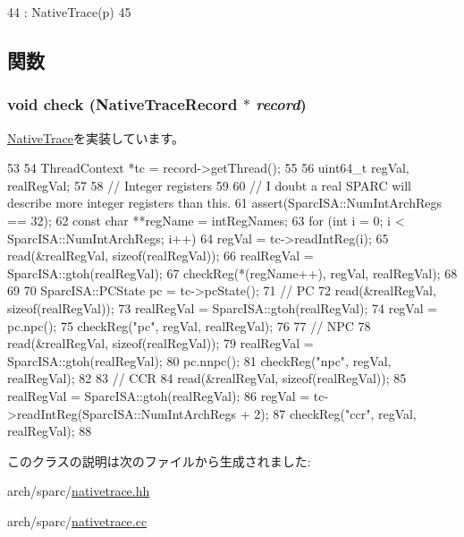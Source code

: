 \begin{DoxyCode}
44                                       : NativeTrace(p)
45     {}
\end{DoxyCode}


\subsection{関数}
\hypertarget{classTrace_1_1SparcNativeTrace_a826e1279dfa7dd9ce6760a2e6efe4116}{
\subsubsection[{check}]{\setlength{\rightskip}{0pt plus 5cm}void check ({\bf NativeTraceRecord} $\ast$ {\em record})}}
\label{classTrace_1_1SparcNativeTrace_a826e1279dfa7dd9ce6760a2e6efe4116}


\hyperlink{classTrace_1_1NativeTrace_adb484644aa43b4370d31b6a7286b0dd1}{NativeTrace}を実装しています。


\begin{DoxyCode}
53 {
54     ThreadContext *tc = record->getThread();
55 
56     uint64_t regVal, realRegVal;
57 
58     // Integer registers
59 
60     // I doubt a real SPARC will describe more integer registers than this.
61     assert(SparcISA::NumIntArchRegs == 32);
62     const char **regName = intRegNames;
63     for (int i = 0; i < SparcISA::NumIntArchRegs; i++) {
64         regVal = tc->readIntReg(i);
65         read(&realRegVal, sizeof(realRegVal));
66         realRegVal = SparcISA::gtoh(realRegVal);
67         checkReg(*(regName++), regVal, realRegVal);
68     }
69 
70     SparcISA::PCState pc = tc->pcState();
71     // PC
72     read(&realRegVal, sizeof(realRegVal));
73     realRegVal = SparcISA::gtoh(realRegVal);
74     regVal = pc.npc();
75     checkReg("pc", regVal, realRegVal);
76 
77     // NPC
78     read(&realRegVal, sizeof(realRegVal));
79     realRegVal = SparcISA::gtoh(realRegVal);
80     pc.nnpc();
81     checkReg("npc", regVal, realRegVal);
82 
83     // CCR
84     read(&realRegVal, sizeof(realRegVal));
85     realRegVal = SparcISA::gtoh(realRegVal);
86     regVal = tc->readIntReg(SparcISA::NumIntArchRegs + 2);
87     checkReg("ccr", regVal, realRegVal);
88 }
\end{DoxyCode}


このクラスの説明は次のファイルから生成されました:\begin{DoxyCompactItemize}
\item 
arch/sparc/\hyperlink{arch_2sparc_2nativetrace_8hh}{nativetrace.hh}\item 
arch/sparc/\hyperlink{arch_2sparc_2nativetrace_8cc}{nativetrace.cc}\end{DoxyCompactItemize}
